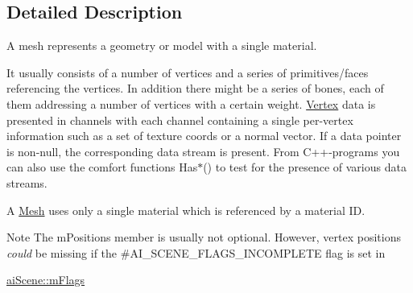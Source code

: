 \subsection{Detailed Description}
A mesh represents a geometry or model with a single material. 

It usually consists of a number of vertices and a series of primitives/faces referencing the vertices. In addition there might be a series of bones, each of them addressing a number of vertices with a certain weight. \hyperlink{struct_vertex}{Vertex} data is presented in channels with each channel containing a single per-\/vertex information such as a set of texture coords or a normal vector. If a data pointer is non-\/null, the corresponding data stream is present. From C++-\/programs you can also use the comfort functions Has$\ast$() to test for the presence of various data streams.

A \hyperlink{class_mesh}{Mesh} uses only a single material which is referenced by a material I\+D. \begin{DoxyNote}{Note}
The m\+Positions member is usually not optional. However, vertex positions {\itshape could} be missing if the \#\+A\+I\+\_\+\+S\+C\+E\+N\+E\+\_\+\+F\+L\+A\+G\+S\+\_\+\+I\+N\+C\+O\+M\+P\+L\+E\+T\+E flag is set in 
\begin{DoxyCode}
\hyperlink{structai_scene_a4091f10bb81e05db00ebc34f40c48f38}{aiScene::mFlags}
\end{DoxyCode}
 
\end{DoxyNote}


